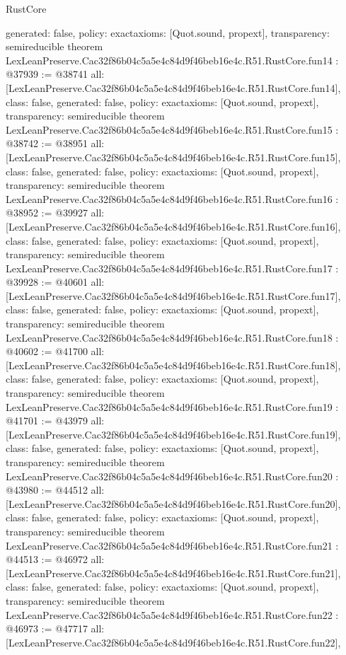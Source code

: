 \begin{lexlean}{RustCore}
\begin{coremodule}
{  generated: false,
  policy: exact{axioms: [Quot.sound, propext]},
  transparency: semireducible
}
theorem LexLeanPreserve.Cac32f86b04c5a5e4c84d9f46beb16e4c.R51.RustCore.fun14 : @37939 := @38741 {
  all: [LexLeanPreserve.Cac32f86b04c5a5e4c84d9f46beb16e4c.R51.RustCore.fun14],
  class: false,
  generated: false,
  policy: exact{axioms: [Quot.sound, propext]},
  transparency: semireducible
}
theorem LexLeanPreserve.Cac32f86b04c5a5e4c84d9f46beb16e4c.R51.RustCore.fun15 : @38742 := @38951 {
  all: [LexLeanPreserve.Cac32f86b04c5a5e4c84d9f46beb16e4c.R51.RustCore.fun15],
  class: false,
  generated: false,
  policy: exact{axioms: [Quot.sound, propext]},
  transparency: semireducible
}
theorem LexLeanPreserve.Cac32f86b04c5a5e4c84d9f46beb16e4c.R51.RustCore.fun16 : @38952 := @39927 {
  all: [LexLeanPreserve.Cac32f86b04c5a5e4c84d9f46beb16e4c.R51.RustCore.fun16],
  class: false,
  generated: false,
  policy: exact{axioms: [Quot.sound, propext]},
  transparency: semireducible
}
theorem LexLeanPreserve.Cac32f86b04c5a5e4c84d9f46beb16e4c.R51.RustCore.fun17 : @39928 := @40601 {
  all: [LexLeanPreserve.Cac32f86b04c5a5e4c84d9f46beb16e4c.R51.RustCore.fun17],
  class: false,
  generated: false,
  policy: exact{axioms: [Quot.sound, propext]},
  transparency: semireducible
}
theorem LexLeanPreserve.Cac32f86b04c5a5e4c84d9f46beb16e4c.R51.RustCore.fun18 : @40602 := @41700 {
  all: [LexLeanPreserve.Cac32f86b04c5a5e4c84d9f46beb16e4c.R51.RustCore.fun18],
  class: false,
  generated: false,
  policy: exact{axioms: [Quot.sound, propext]},
  transparency: semireducible
}
theorem LexLeanPreserve.Cac32f86b04c5a5e4c84d9f46beb16e4c.R51.RustCore.fun19 : @41701 := @43979 {
  all: [LexLeanPreserve.Cac32f86b04c5a5e4c84d9f46beb16e4c.R51.RustCore.fun19],
  class: false,
  generated: false,
  policy: exact{axioms: [Quot.sound, propext]},
  transparency: semireducible
}
theorem LexLeanPreserve.Cac32f86b04c5a5e4c84d9f46beb16e4c.R51.RustCore.fun20 : @43980 := @44512 {
  all: [LexLeanPreserve.Cac32f86b04c5a5e4c84d9f46beb16e4c.R51.RustCore.fun20],
  class: false,
  generated: false,
  policy: exact{axioms: [Quot.sound, propext]},
  transparency: semireducible
}
theorem LexLeanPreserve.Cac32f86b04c5a5e4c84d9f46beb16e4c.R51.RustCore.fun21 : @44513 := @46972 {
  all: [LexLeanPreserve.Cac32f86b04c5a5e4c84d9f46beb16e4c.R51.RustCore.fun21],
  class: false,
  generated: false,
  policy: exact{axioms: [Quot.sound, propext]},
  transparency: semireducible
}
theorem LexLeanPreserve.Cac32f86b04c5a5e4c84d9f46beb16e4c.R51.RustCore.fun22 : @46973 := @47717 {
  all: [LexLeanPreserve.Cac32f86b04c5a5e4c84d9f46beb16e4c.R51.RustCore.fun22],
}
\end{coremodule}
\end{lexlean}
